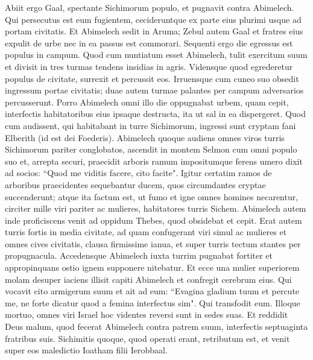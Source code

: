 \begin{biblechapter}
\verse Abiit ergo Gaal, spectante Sichimorum populo, et pugnavit contra Abimelech. 
\verse Qui persecutus est eum fugientem, cecideruntque ex parte eius plurimi usque ad portam civitatis. 
\verse Et Abimelech sedit in Aruma; Zebul autem Gaal et fratres eius expulit de urbe nec in ea passus est commorari. 
\verse Sequenti ergo die egressus est populus in campum. Quod cum nuntiatum esset Abimelech, 
\verse tulit exercitum suum et divisit in tres turmas tendens insidias in agris. Vidensque quod egrederetur populus de civitate, surrexit et percussit eos. 
\verse Irruensque cum cuneo suo obsedit ingressum portae civitatis; duae autem turmae palantes per campum adversarios percusserunt.  
\verse Porro Abimelech omni illo die oppugnabat urbem, quam cepit, interfectis habitatoribus eius ipsaque destructa, ita ut sal in ea dispergeret. 
\verse Quod cum audissent, qui habitabant in turre Sichimorum, ingressi sunt cryptam fani Elberith (id est dei Foederis). 
\verse Abimelech quoque audiens omnes viros turris Sichimorum pariter conglobatos, 
\verse ascendit in montem Selmon cum omni populo suo et, arrepta securi, praecidit arboris ramum impositumque ferens umero dixit ad socios: “Quod me viditis facere, cito facite". 
\verse Igitur certatim ramos de arboribus praecidentes sequebantur ducem, quos circumdantes cryptae succenderunt; atque ita factum est, ut fumo et igne omnes homines necarentur, circiter mille viri pariter ac mulieres, habitatores turris Sichem. 
\verse Abimelech autem inde proficiscens venit ad oppidum Thebes, quod obsidebat et cepit. 
\verse Erat autem turris fortis in media civitate, ad quam confugerant viri simul ac mulieres et omnes cives civitatis, clausa firmissime ianua, et super turris tectum stantes per propugnacula. 
\verse Accedensque Abimelech iuxta turrim pugnabat fortiter et appropinquans ostio ignem supponere nitebatur. 
\verse Et ecce una mulier superiorem molam desuper iaciens illisit capiti Abimelech et confregit cerebrum eius. 
\verse Qui vocavit cito armigerum suum et ait ad eum: “Evagina gladium tuum et percute me, ne forte dicatur quod a femina interfectus sim". Qui transfodit eum. 
\verse Illoque mortuo, omnes viri Israel hoc videntes reversi sunt in sedes suas. 
\verse Et reddidit Deus malum, quod fecerat Abimelech contra patrem suum, interfectis septuaginta fratribus suis.  
\verse Sichimitis quoque, quod operati erant, retributum est, et venit super eos maledictio Ioatham filii Ierobbaal. 
\end{biblechapter}

